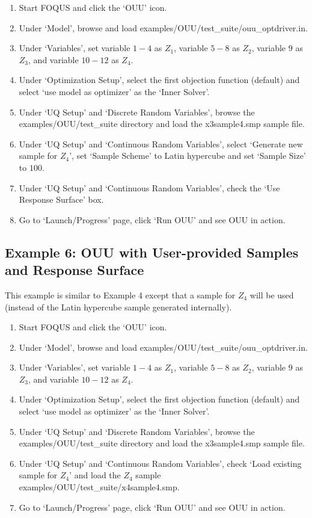 \begin{enumerate}
\item Start FOQUS and click the `OUU' icon.
\item Under `Model', browse and load {\sf examples/OUU/test\_suite/ouu\_optdriver.in}.
\item Under `Variables', set variable $1-4$ as $Z_1$, variable $5-8$ as $Z_2$, 
      variable $9$ as $Z_3$, and variable $10-12$ as $Z_4$.
\item Under `Optimization Setup', select the first objection function (default)
      and select `use model as optimizer' as the `Inner Solver'.
\item Under `UQ Setup' and `Discrete Random Variables', browse the
      {\sf examples/OUU/test\_suite} directory and load the
      {\sf x3sample4.smp} sample file.
\item Under `UQ Setup' and `Continuous Random Variables', select
      `Generate new sample for $Z_4$', set `Sample Scheme' to Latin hypercube
      and set `Sample Size' to $100$.
\item Under `UQ Setup' and `Continuous Random Variables', check the
      `Use Response Surface' box.
\item Go to `Launch/Progress' page, click `Run OUU' and see OUU in action.
\end{enumerate}

\subsection{Example 6: OUU with User-provided Samples and Response Surface}

This example is similar to Example 4 except that a sample for $Z_4$ will be
used (instead of the Latin hypercube sample generated internally).

\begin{enumerate}
\item Start FOQUS and click the `OUU' icon.
\item Under `Model', browse and load {\sf examples/OUU/test\_suite/ouu\_optdriver.in}.
\item Under `Variables', set variable $1-4$ as $Z_1$, variable $5-8$ as $Z_2$, 
      variable $9$ as $Z_3$, and variable $10-12$ as $Z_4$.
\item Under `Optimization Setup', select the first objection function (default)
      and select `use model as optimizer' as the `Inner Solver'.
\item Under `UQ Setup' and `Discrete Random Variables', browse the
      {\sf examples/OUU/test\_suite} directory and load the
      {\sf x3sample4.smp} sample file.
\item Under `UQ Setup' and `Continuous Random Variables', check `Load existing
      sample for $Z_4$' and load the $Z_4$ sample 
      {\sf examples/OUU/test\_suite/x4sample4.smp}.
\item Go to `Launch/Progress' page, click `Run OUU' and see OUU in action.
\end{enumerate}


